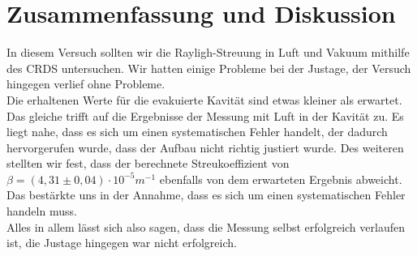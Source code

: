 \section{Zusammenfassung und Diskussion}
In diesem Versuch sollten wir die Rayligh-Streuung in Luft und Vakuum mithilfe des CRDS untersuchen. Wir hatten einige Probleme bei der Justage, der Versuch hingegen verlief ohne Probleme.\\
Die erhaltenen Werte für die evakuierte Kavität sind etwas kleiner als erwartet. Das gleiche trifft auf die Ergebnisse der Messung mit Luft in der Kavität zu. Es liegt nahe, dass es sich um einen systematischen Fehler handelt, der dadurch hervorgerufen wurde, dass der Aufbau nicht richtig justiert wurde.
Des weiteren stellten wir fest, dass der berechnete Streukoeffizient von $\beta =   (4,31 \pm 0,04) \cdot 10^{-5} m^{-1}$ ebenfalls von dem erwarteten Ergebnis abweicht. Das bestärkte uns in der Annahme, dass es sich um einen systematischen Fehler handeln muss.\\
Alles in allem lässt sich also sagen, dass die Messung selbst erfolgreich verlaufen ist, die Justage hingegen war nicht erfolgreich.